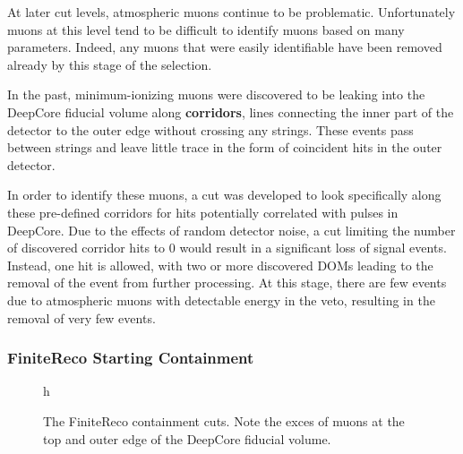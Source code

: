 At later cut levels, atmospheric muons continue to be problematic.
Unfortunately muons at this level tend to be difficult to identify muons based on many parameters.
Indeed, any muons that were easily identifiable have been removed already by this stage of the selection.

In the past, minimum-ionizing muons were discovered to be leaking into the DeepCore fiducial volume along \textbf{corridors}, lines connecting the inner part of the detector to the outer edge without crossing any strings.
These events pass between strings and leave little trace in the form of coincident hits in the outer detector.

In order to identify these muons, a cut was developed to look specifically along these pre-defined corridors for hits potentially correlated with pulses in DeepCore.
Due to the effects of random detector noise, a cut limiting the number of discovered corridor hits to 0 would result in a significant loss of signal events.
Instead, one hit is allowed, with two or more discovered DOMs leading to the removal of the event from further processing.
At this stage, there are few events due to atmospheric muons with detectable energy in the veto, resulting in the removal of very few events.



\subsubsection{FiniteReco Starting Containment}
\begin{figure}{h}%
	\centering
	\caption[The FiniteReco Containment Cuts]{The FiniteReco containment cuts. Note the exces of muons at the top and outer edge of the DeepCore fiducial volume.}%
	\label{fig:finitereco_cuts}%
\end{figure}

